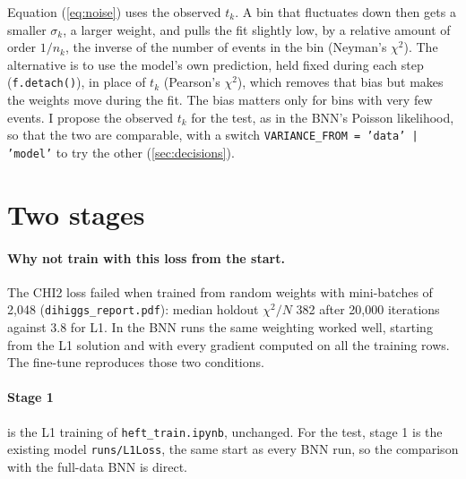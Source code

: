 \documentclass[11pt]{article}
\newcommand{\file}[1]{\nolinkurl{#1}}
\newcommand{\code}[1]{\texttt{#1}}
\begin{document}
\begin{watch}
Equation (\ref{eq:noise}) uses the observed $t_k$. A bin that fluctuates down then gets a
smaller $\sigma_k$, a larger weight, and pulls the fit slightly low, by a relative amount
of order $1/n_k$, the inverse of the number of events in the bin (Neyman's $\chi^2$). The
alternative is to use the model's own prediction, held fixed during each step
(\code{f.detach()}), in place of $t_k$ (Pearson's $\chi^2$), which removes that bias but
makes the weights move during the fit. The bias matters only for bins with very few events.
I propose the observed $t_k$ for the test, as in the BNN's Poisson likelihood, so that the
two are comparable, with a switch \code{VARIANCE\_FROM = 'data' | 'model'} to try the other
(\cref{sec:decisions}).
\end{watch}

\section{Two stages}
\label{sec:stages}

\paragraph{Why not train with this loss from the start.} The CHI2 loss failed when trained
from random weights with mini-batches of 2,048 (\file{dihiggs_report.pdf}): median holdout
$\chi^2/N$ 382 after 20,000 iterations against 3.8 for L1. In the BNN runs the same
weighting worked well, starting from the L1 solution and with every gradient computed on
all the training rows. The fine-tune reproduces those two conditions.

\paragraph{Stage 1} is the L1 training of \file{heft_train.ipynb}, unchanged. For the test,
stage 1 is the existing model \file{runs/L1Loss}, the same start as every BNN run, so the
comparison with the full-data BNN is direct.
\end{document}

